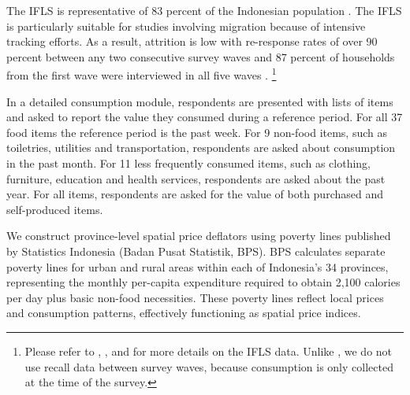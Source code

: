The IFLS is representative of 83 percent of the Indonesian population \citep{strauss2004third}. The IFLS is particularly suitable for studies involving migration because of intensive tracking efforts. As a result, attrition is low with re-response rates of over 90 percent between any two consecutive survey waves and 87 percent of households from the first wave were interviewed in all five waves \citep{straussFifthWaveIndonesia2016}.%
\footnote{Please refer to \cite{kleemansLabourMarketResponses2018}, \cite{hamoryReevaluatingAgriculturalProductivity2021}, and \cite{kleemansMigrationChoiceRisk} for more details on the IFLS data. Unlike \cite{hamoryReevaluatingAgriculturalProductivity2021}, we do not use recall data between survey waves, because consumption is only collected at the time of the survey.}

In a detailed consumption module, respondents are presented with lists of items and asked to report the value they consumed during a reference period. For all 37 food items the reference period is the past week. For 9 non-food items, such as toiletries, utilities and transportation, respondents are asked about consumption in the past month. For 11 less frequently consumed items, such as clothing, furniture, education and health services,  respondents are asked about the past year. For all items, respondents are asked for the value of both purchased and self-produced items. 

We construct province-level spatial price deflators using poverty lines published by Statistics Indonesia (Badan Pusat Statistik, BPS). 
BPS calculates separate poverty lines for urban and rural areas within each of Indonesia's 34 provinces, representing the monthly per-capita expenditure required to obtain 2,100 calories per day plus basic non-food necessities. 
These poverty lines reflect local prices and consumption patterns, effectively functioning as spatial price indices.

